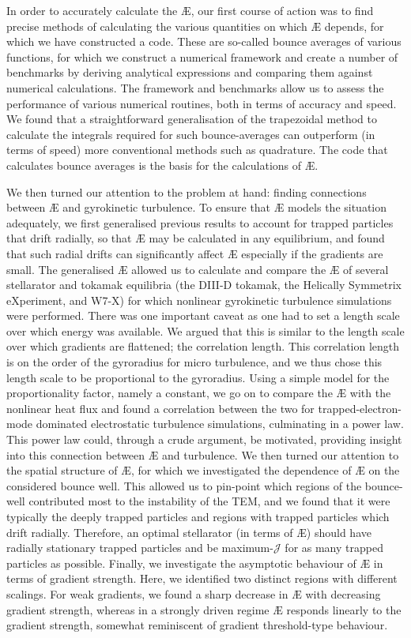 In order to accurately calculate the \AE{}, our first course of action was to find precise methods of calculating the various quantities on which \AE{} depends, for which we have constructed a code. These are so-called bounce averages of various functions, for which we construct a numerical framework and create a number of benchmarks by deriving analytical expressions and comparing them against numerical calculations. The framework and benchmarks allow us to assess the performance of various numerical routines, both in terms of accuracy and speed. We found that a straightforward generalisation of the trapezoidal method to calculate the integrals required for such bounce-averages can outperform (in terms of speed) more conventional methods such as quadrature. The code that calculates bounce averages is the basis for the calculations of \AE{}. \par 
We then turned our attention to the problem at hand: finding connections between \AE{} and gyrokinetic turbulence. To ensure that \AE{} models the situation adequately, we first generalised previous results to account for trapped particles that drift radially, so that \AE{} may be calculated in any equilibrium, and found that such radial drifts can significantly affect \AE{} especially if the gradients are small. The generalised \AE{} allowed us to calculate and compare the \AE{} of several stellarator and tokamak equilibria (the DIII-D tokamak, the Helically Symmetrix eXperiment, and W7-X) for which nonlinear gyrokinetic turbulence simulations were performed. There was one important caveat as one had to set a length scale over which energy was available. We argued that this is similar to the length scale over which gradients are flattened; the correlation length. This correlation length is on the order of the gyroradius for micro turbulence, and we thus chose this length scale to be proportional to the gyroradius. Using a simple model for the proportionality factor, namely a constant, we go on to compare the \AE{} with the nonlinear heat flux and found a correlation between the two for trapped-electron-mode dominated electrostatic turbulence simulations, culminating in a power law. This power law could, through a crude argument, be motivated, providing insight into this connection between \AE{} and turbulence. We then turned our attention to the spatial structure of \AE{}, for which we investigated the dependence of \AE{} on the considered bounce well. This allowed us to pin-point which regions of the bounce-well contributed most to the instability of the TEM, and we found that it were typically the deeply trapped particles and regions with trapped particles which drift radially. Therefore, an optimal stellarator (in terms of \AE{}) should have radially stationary trapped particles and be maximum-$\mathcal{J}$ for as many trapped particles as possible. Finally, we investigate the asymptotic behaviour of \AE{} in terms of gradient strength. Here, we identified two distinct regions with different scalings. For weak gradients, we found a sharp decrease in \AE{} with decreasing gradient strength, whereas in a strongly driven regime \AE{} responds linearly to the gradient strength, somewhat reminiscent of gradient threshold-type behaviour. \par

